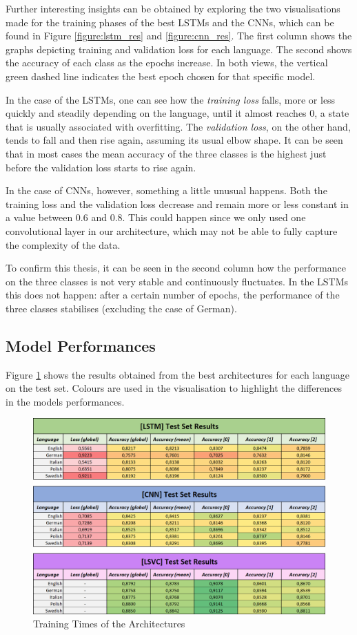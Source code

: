 \documentclass[letterpaper,11pt]{article}
\begin{document}
Further interesting insights can be obtained by exploring the two visualisations made for the training phases of the best LSTMs and the CNNs, which can be found in Figure \ref{figure:lstm_res} and  \ref{figure:cnn_res}. The first column shows the graphs depicting training and validation loss for each language. The second shows the accuracy of each class as the epochs increase. In both views, the vertical green dashed line indicates the best epoch chosen for that specific model. 

In the case of the LSTMs, one can see how the \textit{training loss} falls, more or less quickly and steadily depending on the language, until it almost reaches 0, a state that is usually associated with overfitting. The \textit{validation loss}, on the other hand, tends to fall and then rise again, assuming its usual elbow shape. It can be seen that in most cases the mean accuracy of the three classes is the highest just before the validation loss starts to rise again.

In the case of CNNs, however, something a little unusual happens. Both the training loss and the validation loss decrease and remain more or less constant in a value between 0.6 and 0.8. This could happen since we only used one convolutional layer in our architecture, which may not be able to fully capture the complexity of the data.

To confirm this thesis, it can be seen in the second column how the performance on the three classes is not very stable and continuously fluctuates. In the LSTMs this does not happen: after a certain number of epochs, the performance of the three classes stabilises (excluding the case of German).  

\subsection{Model Performances}

Figure \ref{fig:results} shows the results obtained from the best architectures for each language on the test set. Colours are used in the visualisation to highlight the differences in the models performances.  

\begin{figure}[H]
  \centering
  \includegraphics[width=\textwidth]{results.png}
  \caption{Training Times of the Architectures}
  \label{fig:results}
\end{figure}
\end{document}
